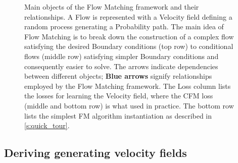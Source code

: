 \documentclass{fairmeta}
\newcommand{\highlight}[1]{{\color{metablue} \textbf{#1}}}
\numberwithin{equation}{section}
\begin{document}
\begin{figure}[t]
\begin{center}
{}
\end{center}
\caption{
  Main objects of the Flow Matching framework and their relationships.
  A \colorbox{metabg} {Flow} is represented with a \colorbox{metabg}{Velocity field} defining a random process generating a \colorbox{metabg}{Probability path}. The main idea of Flow Matching is to break down the construction of a complex flow satisfying the desired \colorbox{metabg}{Boundary conditions} (top row) to  conditional flows (middle row) satisfying simpler \colorbox{metabg}{Boundary conditions} and consequently easier to solve. The arrows indicate dependencies between different objects;  \highlight{Blue arrows} signify relationships employed by the Flow Matching framework. The \colorbox{metabg}{Loss} column lists the losses for learning the \colorbox{metabg}{Velocity field}, where the CFM loss (middle and bottom row) is what used in practice. The bottom row lists the simplest FM algorithm instantiation as described in \cref{s:quick_tour}.   
  }
\label{fig:diagram}
\end{figure}


\subsection{Deriving generating velocity fields}\label{sec:Deriving generating velocity fields}
\end{document}
